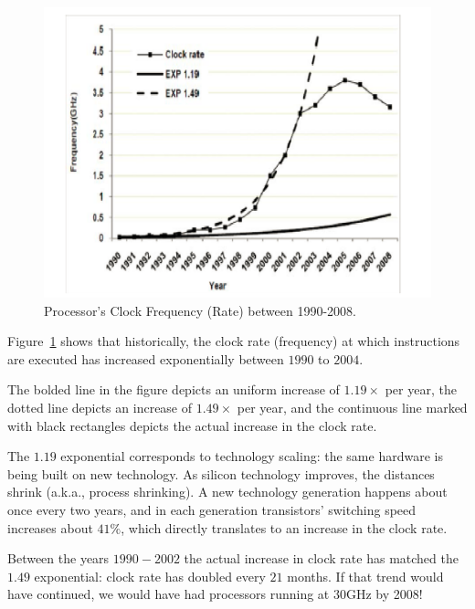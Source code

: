 \documentclass[acmsmall,review]{acmart}\settopmatter{printfolios=true,printccs=false,printacmref=false}
\begin{document}
\begin{figure}
\includegraphics[width=70ex]{Figures/L1/FreqGraph}
\caption{Processor's Clock Frequency (Rate) between 1990-2008.}
\label{fig:cpu-freq}
\end{figure} 

Figure~\ref{fig:cpu-freq} shows that historically, the clock
rate (frequency) at which instructions are executed has
increased exponentially between $1990$ to $2004$.

The bolded line in the figure depicts an uniform increase of
$1.19\times$ per year, the dotted line depicts an increase of
$1.49\times$ per year, and the continuous line marked with
black rectangles depicts the actual increase in the clock rate.

The $1.19$ exponential corresponds to technology scaling:
the same hardware is being built on new technology. As silicon
technology improves, the distances shrink (a.k.a., process 
shrinking).  A new technology generation happens about
once every two years, and in each generation transistors'
switching speed increases about $41\%$, which directly
translates to an increase in the clock rate.

Between the years $1990-2002$ the actual increase in clock
rate has matched the $1.49$ exponential: clock rate has doubled 
every $21$ months. If that trend would have continued, we
would have had processors running at $30$GHz by 2008!
\end{document}
